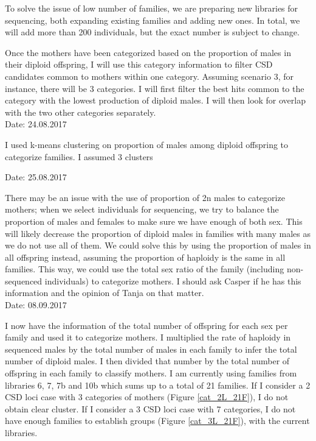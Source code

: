\documentclass[10pt,a4paper]{report}
\begin{document}
To solve the issue of low number of families, we are preparing new libraries for sequencing, both expanding existing families and adding new ones. In total, we will add more than 200 individuals, but the exact number is subject to change.

Once the mothers have been categorized based on the proportion of males in their diploid offspring, I will use this category information to filter CSD candidates common to mothers within one category.
Assuming scenario 3, for instance, there will be 3 categories. I will first filter the best hits common to the category with the lowest production of diploid males. I will then look for overlap with the two other categories separately.\\

Date: 24.08.2017

I used k-means clustering on proportion of males among diploid offspring to categorize families. I assumed 3 clusters

Date: 25.08.2017

There may be an issue with the use of proportion of 2n males to categorize mothers; when we select individuals for sequencing, we try to balance the proportion of males and females to make sure we have enough of both sex. This will likely decrease the proportion of diploid males in families with many males as we do not use all of them. 
We could solve this by using the proportion of males in all offspring instead, assuming the proportion of haploidy is the same in all families. This way, we could use the total sex ratio of the family (including non-sequenced individuals) to categorize mothers. I should ask Casper if he has this information and the opinion of Tanja on that matter.\\

Date: 08.09.2017

I now have the information of the total number of offspring for each sex per family and used it to categorize mothers. I multiplied the rate of haploidy in sequenced males by the total number of males in each family to infer the total number of diploid males. I then divided that number by the total number of offspring in each family to classify mothers. I am currently using families from libraries 6, 7, 7b and 10b which sums up to a total of 21 families. If I consider a 2 CSD loci case with 3 categories of mothers (Figure \ref{cat_2L_21F}), I do not obtain clear cluster. If I consider a 3 CSD loci case with 7 categories, I do not have enough families to establish groups (Figure \ref{cat_3L_21F}), with the current libraries.
\end{document}
